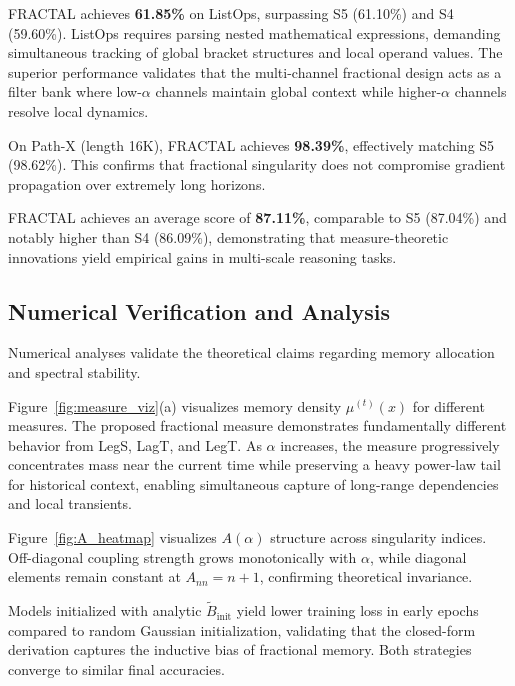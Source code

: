 \documentclass{article}
\theoremstyle{plain}
\theoremstyle{definition}
\theoremstyle{remark}
\begin{document}
FRACTAL achieves \textbf{61.85\%} on ListOps, surpassing S5 (61.10\%) and S4 (59.60\%). 
ListOps requires parsing nested mathematical expressions, demanding simultaneous tracking of global bracket structures and local operand values.
The superior performance validates that the multi-channel fractional design acts as a filter bank where low-$\alpha$ channels maintain global context while higher-$\alpha$ channels resolve local dynamics.

On Path-X (length 16K), FRACTAL achieves \textbf{98.39\%}, effectively matching S5 (98.62\%). 
This confirms that fractional singularity does not compromise gradient propagation over extremely long horizons.

FRACTAL achieves an average score of \textbf{87.11\%}, comparable to S5 (87.04\%) and notably higher than S4 (86.09\%), demonstrating that measure-theoretic innovations yield empirical gains in multi-scale reasoning tasks.

\subsection{Numerical Verification and Analysis}
\label{subsec:analysis}

Numerical analyses validate the theoretical claims regarding memory allocation and spectral stability.

Figure~\ref{fig:measure_viz}(a) visualizes memory density $\mu^{(t)}(x)$ for different measures. The proposed fractional measure demonstrates fundamentally different behavior from LegS, LagT, and LegT. As $\alpha$ increases, the measure progressively concentrates mass near the current time while preserving a heavy power-law tail for historical context, enabling simultaneous capture of long-range dependencies and local transients.

Figure~\ref{fig:A_heatmap} visualizes $A(\alpha)$ structure across singularity indices. Off-diagonal coupling strength grows monotonically with $\alpha$, while diagonal elements remain constant at $A_{nn} = n+1$, confirming theoretical invariance.

Models initialized with analytic $\tilde{B}_{\mathrm{init}}$ yield lower training loss in early epochs compared to random Gaussian initialization, validating that the closed-form derivation captures the inductive bias of fractional memory. Both strategies converge to similar final accuracies.
\end{document}

